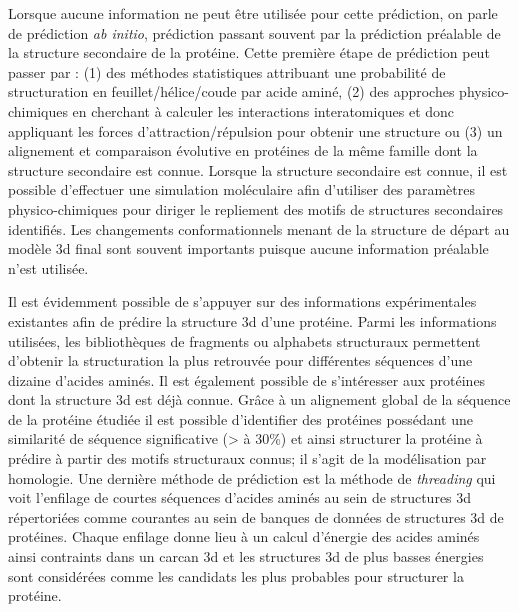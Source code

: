 Lorsque aucune information ne peut être utilisée pour cette prédiction, on parle de prédiction \textit{ab initio}, prédiction passant souvent par la prédiction préalable de la structure secondaire de la protéine. Cette première étape de prédiction peut passer par : (1) des méthodes statistiques attribuant une probabilité de structuration en feuillet/hélice/coude par acide aminé, (2) des approches physico-chimiques en cherchant à calculer les interactions interatomiques et donc appliquant les forces d'attraction/répulsion pour obtenir une structure ou (3) un alignement et comparaison évolutive en protéines de la même famille dont la structure secondaire est connue.
Lorsque la structure secondaire est connue, il est possible d'effectuer une simulation moléculaire afin d'utiliser des paramètres physico-chimiques pour diriger le repliement des motifs de structures secondaires identifiés. Les changements conformationnels menant de la structure de départ au modèle 3d final sont souvent importants puisque aucune information préalable n'est utilisée.

Il est évidemment possible de s'appuyer sur des informations expérimentales existantes afin de prédire la structure 3d d'une protéine. Parmi les informations utilisées, les bibliothèques de fragments ou alphabets structuraux permettent d'obtenir la structuration la plus retrouvée pour différentes séquences d'une dizaine d'acides aminés. 
Il est également possible de s'intéresser aux protéines dont la structure 3d est déjà connue. Grâce à un alignement global de la séquence de la protéine étudiée il est possible d'identifier des protéines possédant une similarité de séquence significative (> à 30\%) et ainsi structurer la protéine à prédire à partir des motifs structuraux connus; il s'agit de la modélisation par homologie.
Une dernière méthode de prédiction est la méthode de \textit{threading} qui voit l'enfilage de courtes séquences d'acides aminés au sein de structures 3d répertoriées comme courantes au sein de banques de données de structures 3d de protéines. Chaque enfilage donne lieu à un calcul d'énergie des acides aminés ainsi contraints dans un carcan 3d et les structures 3d de plus basses énergies sont considérées comme les candidats les plus probables pour structurer la protéine.

